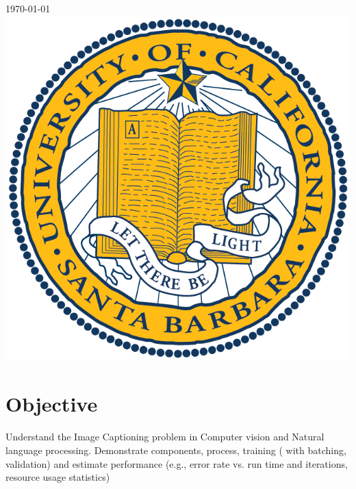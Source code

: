 \begin{titlepage}

{\large \today}\\[1cm] %


\includegraphics{assets/ucsb-logo.png}\\[1cm] %
 
\vfill %
\end{titlepage}


\section{Objective}
Understand the Image Captioning problem in Computer vision and Natural language processing. Demonstrate components, process, training ( with batching, validation) and estimate performance (e.g., error rate vs. run time and iterations, resource usage statistics)

